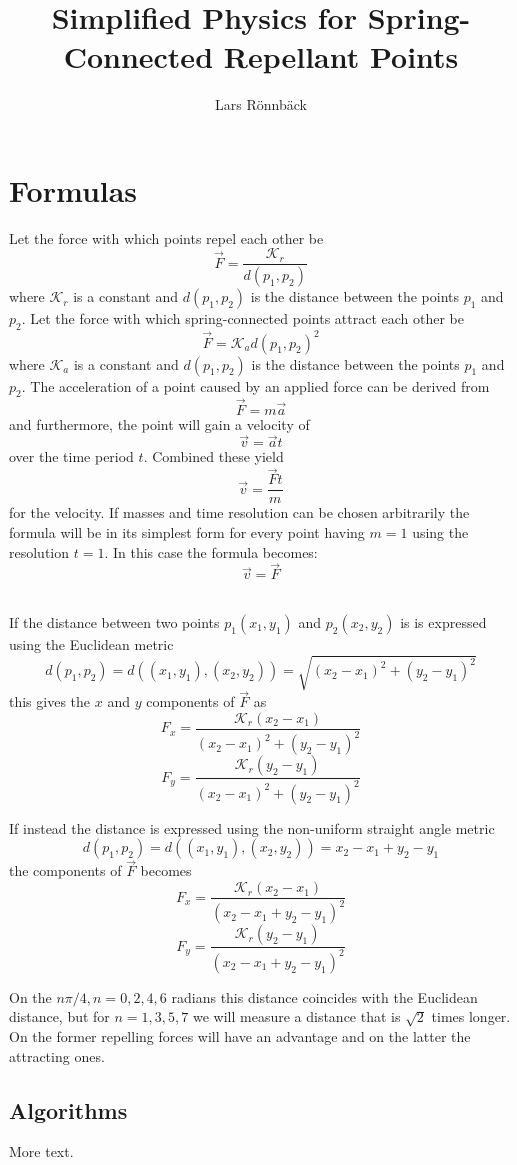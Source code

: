 \documentclass[11pt]{article} %
\title{Simplified Physics for Spring-Connected Repellant Points}
\author{Lars Rönnbäck}
\newcommand{\co}{\mathcal{K}}
\begin{document}
\maketitle

\section{Formulas}

Let the force with which points repel each other be $$\vec{F} = \frac{\co_r}{d(p_1, p_2)}$$ where $\co_r$ is a constant and $d(p_1, p_2)$ is the distance between the points $p_1$ and $p_2$. Let the force with which spring-connected points attract each other be $$\vec{F} = \co_a d(p_1, p_2)^2$$ where $\co_a$ is a constant and $d(p_1, p_2)$ is the distance between the points $p_1$ and $p_2$. The acceleration of a point caused by an applied force can be derived from $$\vec{F} = m\vec{a}$$ and furthermore, the point will gain a velocity of $$\vec{v} = \vec{a}t$$ over the time period $t$. Combined these yield $$\vec{v} = \frac{\vec{F}t}{m}$$ for the velocity. If masses and time resolution can be chosen arbitrarily the formula will be in its simplest form for every point having $m = 1$ using the resolution $t = 1$. In this case the formula becomes: $$\vec{v} = \vec{F}$$\

\noindent
If the distance between two points $p_1(x_1, y_1)$ and $p_2(x_2, y_2)$ is is expressed using the Euclidean metric 
$$d(p_1, p_2) = d((x_1, y_1), (x_2, y_2)) = \sqrt{(x_2 - x_1)^2 + (y_2 - y_1)^2}$$
this gives the $x$ and $y$ components of $\vec{F}$ as
$$F_x = \frac{\co_r (x_2 - x_1)}{(x_2 - x_1)^2 + (y_2 - y_1)^2}$$
$$F_y = \frac{\co_r (y_2 - y_1)}{(x_2 - x_1)^2 + (y_2 - y_1)^2}$$

\noindent
If instead the distance is expressed using the non-uniform straight angle metric
$$d(p_1, p_2) = d((x_1, y_1), (x_2, y_2)) = x_2 - x_1 + y_2 - y_1$$
the components of $\vec{F}$ becomes
$$F_x = \frac{\co_r (x_2 - x_1)}{(x_2 - x_1 + y_2 - y_1)^2}$$
$$F_y = \frac{\co_r (y_2 - y_1)}{(x_2 - x_1 + y_2 - y_1)^2}$$



\noindent
On the $n\pi/4, n = 0,2,4,6$ radians this distance coincides with the Euclidean distance, but for $n = 1,3,5,7$ we will measure a distance that is $\sqrt{2}$ times longer. On the former repelling forces will have an advantage and on the latter the attracting ones. 




\subsection{Algorithms}

More text.
\end{document}
